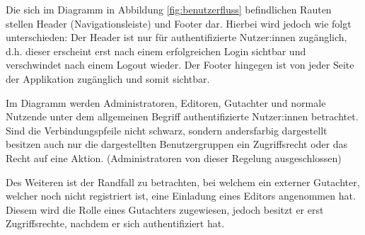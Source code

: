 Die sich im Diagramm in Abbildung \ref{fig:benutzerfluss} befindlichen Rauten stellen Header (Navigationsleiste) und Footer dar.
Hierbei wird jedoch wie folgt unterschieden: Der Header ist nur für authentifizierte Nutzer:innen zugänglich,
d.h. dieser erscheint erst nach einem erfolgreichen Login sichtbar und verschwindet nach einem Logout wieder.
Der Footer hingegen ist von jeder Seite der Applikation zugänglich und somit sichtbar.

Im Diagramm werden Administratoren, Editoren, Gutachter und normale Nutzende unter dem allgemeinen Begriff
authentifizierte Nutzer:innen betrachtet.
Sind die Verbindungspfeile nicht schwarz, sondern andersfarbig dargestellt besitzen auch nur die
dargestellten Benutzergruppen ein Zugriffsrecht oder das Recht auf eine Aktion. (Administratoren von dieser Regelung
ausgeschlossen)

Des Weiteren ist der Randfall zu betrachten, bei welchem ein externer Gutachter, welcher noch nicht registriert ist,
eine Einladung eines Editors angenommen hat.
Diesem wird die Rolle eines Gutachters zugewiesen, jedoch besitzt er erst Zugriffsrechte, nachdem er sich
authentifiziert hat.